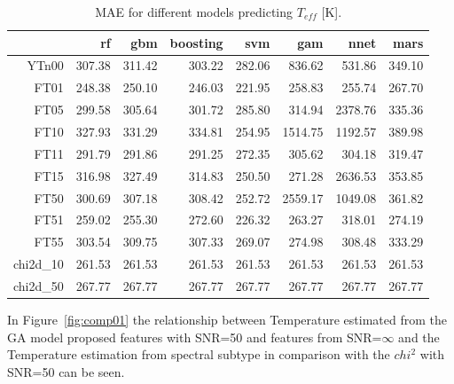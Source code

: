 \begin{table}[ht]
\centering
\begin{tabular}{rrrrrrrr}
  \hline
 & rf & gbm & boosting & svm & gam & nnet & mars \\ 
  \hline
YTn00 & 307.38 & 311.42 & 303.22 & 282.06 & 836.62 & 531.86 & 349.10 \\ 
  FT01 & 248.38 & 250.10 & 246.03 & 221.95 & 258.83 & 255.74 & 267.70 \\ 
  FT05 & 299.58 & 305.64 & 301.72 & 285.80 & 314.94 & 2378.76 & 335.36 \\ 
  FT10 & 327.93 & 331.29 & 334.81 & 254.95 & 1514.75 & 1192.57 & 389.98 \\ 
  FT11 & 291.79 & 291.86 & 291.25 & 272.35 & 305.62 & 304.18 & 319.47 \\ 
  FT15 & 316.98 & 327.49 & 314.83 & 250.50 & 271.28 & 2636.53 & 353.85 \\ 
  FT50 & 300.69 & 307.18 & 308.42 & 252.72 & 2559.17 & 1049.08 & 361.82 \\ 
  FT51 & 259.02 & 255.30 & 272.60 & 226.32 & 263.27 & 318.01 & 274.19 \\ 
  FT55 & 303.54 & 309.75 & 307.33 & 269.07 & 274.98 & 308.48 & 333.29 \\ 
  chi2d\_10 & 261.53 & 261.53 & 261.53 & 261.53 & 261.53 & 261.53 & 261.53 \\ 
  chi2d\_50 & 267.77 & 267.77 & 267.77 & 267.77 & 267.77 & 267.77 & 267.77 \\ 
   \hline
\end{tabular}
\caption { MAE for different models predicting $T_{eff}$ [K].} 
\label{tab:models_T_mae} 
\end{table}


In Figure~\ref{fig:comp01} the relationship between Temperature estimated from 
the GA model proposed features with SNR=50 and features from SNR=$\infty$ 
and the Temperature estimation from spectral subtype 
in comparison with the $chi^2$ with SNR=50 can be seen.

